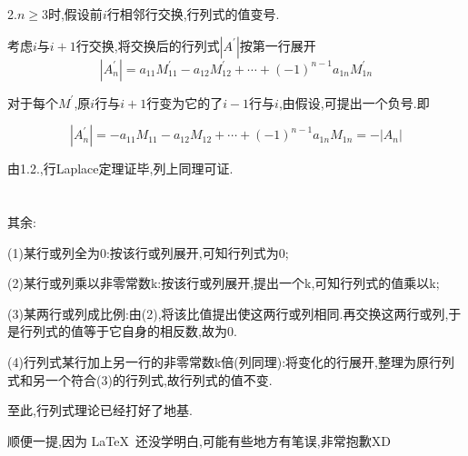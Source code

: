 \documentclass[]{ctexart}
\begin{document}
2.$n\geq 3$时,假设前$i$行相邻行交换,行列式的值变号.

考虑$i$与$i+1$行交换,将交换后的行列式$\left| A^{'}\right|$按第一行展开
$$
\left|A^{'}_{n}\right|=a_{11} M^{'}_{11}-a_{12} M^{'}_{12}+\cdots+(-1)^{n-1} a_{1 n} M^{'}_{1 n}
$$

对于每个$M^{'}$,原$i$行与$i+1$行变为它的了$i-1$行与$i$,由假设,可提出一个负号.即

$$
\left|A^{'}_{n}\right|=-a_{11} M_{11}-a_{12} M_{12}+\cdots+(-1)^{n-1} a_{1 n} M_{1 n}=-\left|A_{n}\right|
$$

由1.2.,行Laplace定理证毕,列上同理可证.

\section*{}
\newpage
其余:

(1)某行或列全为0:按该行或列展开,可知行列式为0;

(2)某行或列乘以非零常数k:按该行或列展开,提出一个k,可知行列式的值乘以k;

(3)某两行或列成比例:由(2),将该比值提出使这两行或列相同.再交换这两行或列,于是行列式的值等于它自身的相反数,故为0.

(4)行列式某行加上另一行的非零常数k倍(列同理):将变化的行展开,整理为原行列式和另一个符合(3)的行列式,故行列式的值不变.

至此,行列式理论已经打好了地基.

顺便一提,因为 \LaTeX\ 还没学明白,可能有些地方有笔误,非常抱歉XD
\end{document}
